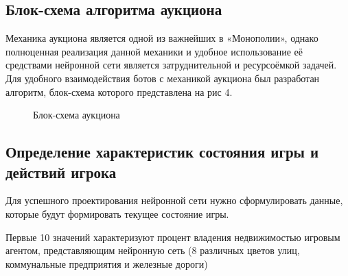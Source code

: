 \begin{Large}
\subsection{Блок-схема алгоритма аукциона}
Механика аукциона является одной из важнейших в «Монополии», однако полноценная реализация данной механики и удобное использование её средствами нейронной сети является затруднительной и ресурсоёмкой задачей. Для удобного взаимодействия ботов с механикой аукциона был разработан алгоритм, блок-схема которого представлена на рис 4.
\begin{figure}[h!]
    \caption{Блок-схема аукциона}
\end{figure}
\newpage
\subsection{Определение характеристик состояния игры и действий игрока}
Для успешного проектирования нейронной сети нужно сформулировать данные, которые будут формировать текущее состояние игры.

Первые 10 значений характеризуют процент владения недвижимостью игровым агентом, представляющим нейронную сеть (8 различных цветов улиц, коммунальные предприятия и железные дороги)


\end{Large}
